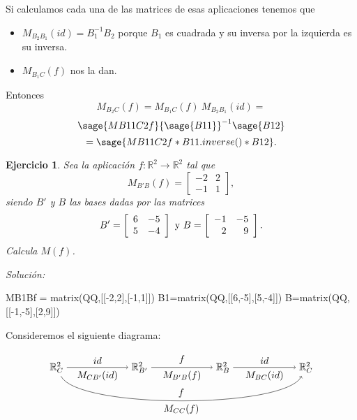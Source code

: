 \documentclass{amsart}
\newtheorem{ejer}{Ejercicio}
\def\r{\mathbb{R}}
\begin{document}
Si calculamos cada una de las matrices de esas aplicaciones tenemos que
\begin{itemize}
\item $M_{B_2B_1}(id) = B_1^{-1} B_2$ porque $B_1$ es cuadrada
y su inversa por la izquierda es su inversa.
\item $M_{B_1C}(f)$ nos la dan. 
\end{itemize}

Entonces 
\[ M_{B_2C}(f) = M_{B_1C}(f) \ M_{B_2B_1}(id) = \] 
\[   \sage{MB11C2f}{\sage{B11}}^{-1}\sage{B12} \] 
\[ = \sage{MB11C2f*B11.inverse()*B12}. \]


\begin{ejer} 
Sea la aplicación $f: \r ^2\to \r ^2$ tal que 
\[ M_{B'B}(f) = \left[ \begin{array}{rr} -2 & 2 \\  -1 & 1 \end{array} \right], \]  siendo $B'$ y $B$ las bases dadas por las matrices 
\[ B' = \left[ \begin{array}{rr} 6 & -5\\ 5 & -4 \end{array} \right] \ \hbox{y} \ B = \left[ \begin{array}{rr} -1 & -5\\ 2 & 9  \end{array} \right].  \] Calcula $M(f)$.
\end{ejer}

{\it Soluci\'on:}

\begin{sageblock}
MB1Bf = matrix(QQ,[[-2,2],[-1,1]])
B1=matrix(QQ,[[6,-5],[5,-4]])
B=matrix(QQ,[[-1,-5],[2,9]])
\end{sageblock}

Consideremos el siguiente diagrama:

$$
\begin{tikzpicture}[xscale = 1.5]
\node (RCa) at (0,0) {$\r^2_C$};
\node (RBp) at (2,0) {$\r^2_{B'}$};
\node (RB)  at (4,0) {$\r^2_B$};
\node (RCb) at (6,0) {$\r^2_C$};
\draw[->] (RCa) to node [above] {$id$} 
                   node [below] {$M_{CB'}(id)$} (RBp);
\draw[->] (RBp) to node [above] {$f$} 
                   node [below] {$M_{B'B}(f)$} (RB); 
\draw[->] (RB)  to node [above] {$id$} 
                   node [below] {$M_{BC}(id)$} (RCb);
\draw[->] (RCa) .. controls (0.5,-1.5) and (5.5,-1.5) .. 
                node [below] {$M_{CC}(f)$} 
                node [above] {$f$} (RCb);
\end{tikzpicture}
$$
\end{document}
